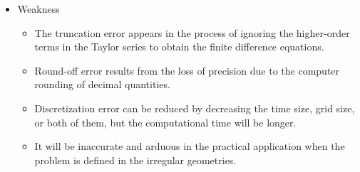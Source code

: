 \begin{itemize}
        \item Weakness \cite{crank1979mathematics} \cite{hoffman2018numerical}
          \begin{itemize}
            \item The truncation error appears in the process of ignoring the higher-order terms in the Taylor series to obtain the finite difference equations.
            \item Round-off error results from the loss of precision due to the computer rounding of decimal quantities.
            \item Discretization error can be reduced by decreasing the time size, grid size, or both of them, but the computational time will be longer.
            \item It will be inaccurate and arduous in the practical application when the problem is defined in the irregular geometries.
          \end{itemize}
      \end{itemize}
      
      
          
